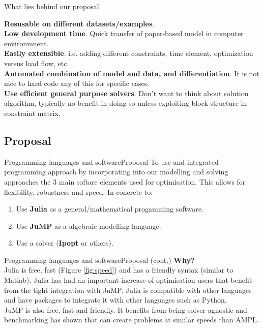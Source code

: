 \documentclass[handout]{beamer}
\begin{document}

\begin{frame}[t]{What lies behind our proposal}

\textbf{Resusable on different datasets/examples}.\\[6pt]

\textbf{Low development time}. Quick transfer of paper-based model in computer environmnent.\\[6pt]

\textbf{Easily extensible}. i.e. adding different constraints, time element, optimization versus load flow, etc.\\[6pt]

\textbf{Automated combination of model and data, and differentiation}. It is not nice to hard code any of this for specific cases.\\[6pt]

\textbf{Use efficient general purpose solvers}. Don't want to think about solution algorithm, typically no benefit in doing so unless exploiting block structure in constraint matrix.

\end{frame}




\subsection{Proposal}
\begin{frame}[t]{Programming languages and software}{Proposal}
  To use and integrated programming approach by incorporating into our modelling and solving approaches the 3 main softare elements used for optimisation. This allows for flexibility, robustness and speed. In concrete to:\\[12pt]
\begin{enumerate}
  \item Use \textbf{Julia} as a general/mathematical progamming software.
  \item Use \textbf{JuMP} as a algebraic modelling language.
  \item Use a solver (\textbf{Ipopt} or others).
\end{enumerate}
\end{frame}

\begin{frame}[t]{Programming languages and software}{Proposal (cont.)}
  \textbf{Why?}\\[12pt]
  Julia is free, fast (Figure \ref{fig:speed}) and has a friendly syntax (similar to Matlab). Julia has had an important increase of optimisation users that benefit from the tight integration with JuMP. Julia is compatible with other languages and have packages to integrate it with other languages such as Python.\\[6pt]

  JuMP is also free, fast and friendly. It benefits from being solver-agnostic and benchmarking has shown that can create problems at similar speeds than AMPL.
\end{frame}
\end{document}
